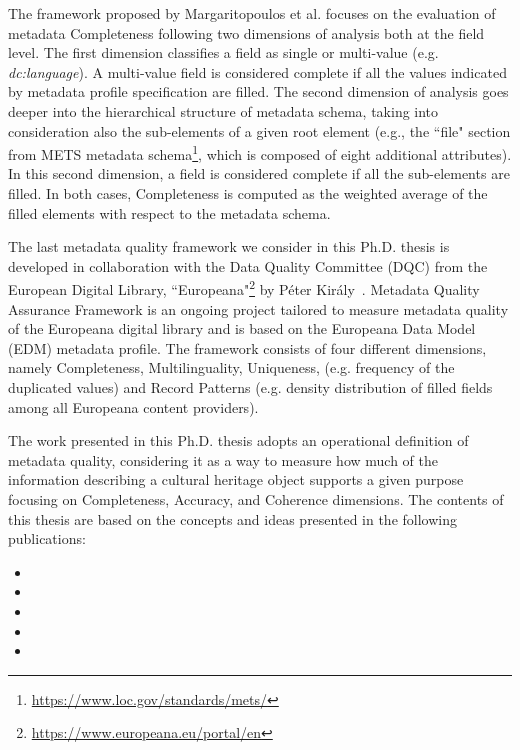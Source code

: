 \documentclass[epsfig,a4paper,12pt,titlepage]{book}
\begin{document}
The framework proposed by Margaritopoulos et al. \cite{margaritopoulos2009fine} focuses on the evaluation of metadata Completeness following two dimensions of analysis both at the field level. The first dimension classifies a field as single or multi-value (e.g. \textit{dc:language}). A multi-value field is considered complete if all the values indicated by metadata profile specification are filled. The second dimension of analysis goes deeper into the hierarchical structure of metadata schema, taking into consideration also the sub-elements of a given root element  (e.g., the ``file" section from METS metadata schema\footnote{\url{https://www.loc.gov/standards/mets/}}, which is composed of eight additional attributes). In this second dimension, a field is considered complete if all the sub-elements are filled. In both cases, Completeness is computed as the weighted average of the filled elements with respect to the metadata schema. 

The last metadata quality framework we consider in this Ph.D. thesis is developed in collaboration with the Data Quality Committee (DQC) from the European Digital Library, ``Europeana"\footnote{\url{https://www.europeana.eu/portal/en}} by P{\'e}ter Kir{\'a}ly~\cite{7}. Metadata Quality Assurance Framework is an ongoing project tailored to measure metadata quality of the Europeana digital library and is based on the Europeana Data Model (EDM) metadata profile. The framework consists of four different dimensions, namely Completeness, Multilinguality, Uniqueness, (e.g. frequency of the duplicated values) and Record Patterns (e.g. density distribution of filled fields among all Europeana content providers).

The work presented in this Ph.D. thesis adopts an operational definition of metadata quality, considering it as a way to measure how much of the information describing a cultural heritage object supports a given purpose~\cite{22} focusing on Completeness, Accuracy, and Coherence dimensions.
The contents of this thesis are based on the concepts and ideas presented in the following publications:
\begin{itemize}
    \item {}
    \item {} 
    \item {}
    \item {}
    \item {} 
\end{itemize}
\end{document}
